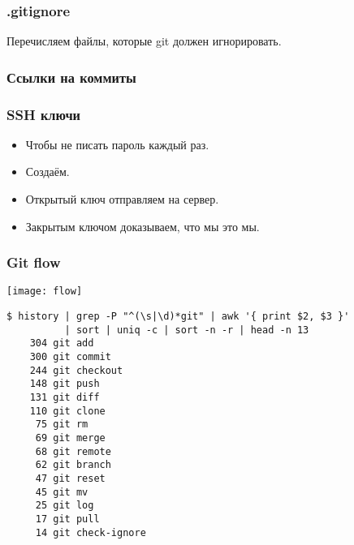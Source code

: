 \documentclass[pdf,russian]{beamer}
\begin{document}
\begin{frame}
    \frametitle{.gitignore}
    Перечисляем файлы, которые git должен игнорировать.
\end{frame}

\begin{frame}
    \frametitle{Ссылки на коммиты}
\end{frame}

\begin{frame}
    \frametitle{SSH ключи}
    \begin{itemize}
        \item Чтобы не писать пароль каждый раз.
        \pause
        \item Создаём.
        \pause
        \item Открытый ключ отправляем на сервер.
        \pause
        \item Закрытым ключом доказываем, что мы это мы.
    \end{itemize}
\end{frame}

\begin{frame}
    \frametitle{Git flow}
    \pause
    \center
    \texttt{[image: flow]}
\end{frame}

\begin{frame}[fragile]
    \begin{verbatim}
$ history | grep -P "^(\s|\d)*git" | awk '{ print $2, $3 }'
          | sort | uniq -c | sort -n -r | head -n 13
    304 git add
    300 git commit
    244 git checkout
    148 git push
    131 git diff
    110 git clone
     75 git rm
     69 git merge
     68 git remote
     62 git branch
     47 git reset
     45 git mv
     25 git log
     17 git pull
     14 git check-ignore
    \end{verbatim}
\end{frame}
\end{document}

